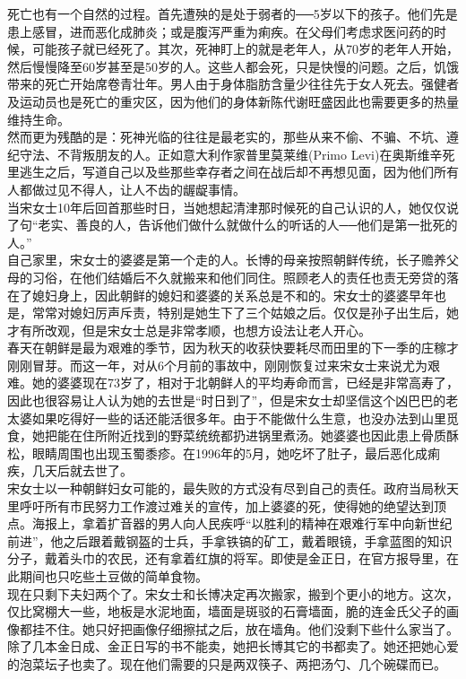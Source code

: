 死亡也有一个自然的过程。首先遭殃的是处于弱者的──5岁以下的孩子。他们先是患上感冒，进而恶化成肺炎；或是腹泻严重为痢疾。在父母们考虑求医问药的时候，可能孩子就已经死了。其次，死神盯上的就是老年人，从70岁的老年人开始，然后慢慢降至60岁甚至是50岁的人。这些人都会死，只是快慢的问题。之后，饥饿带来的死亡开始席卷青壮年。男人由于身体脂肪含量少往往先于女人死去。强健者及运动员也是死亡的重灾区，因为他们的身体新陈代谢旺盛因此也需要更多的热量维持生命。\\

然而更为残酷的是：死神光临的往往是最老实的，那些从来不偷、不骗、不坑、遵纪守法、不背叛朋友的人。正如意大利作家普里莫莱维(Primo Levi)在奥斯维辛死里逃生之后，写道自己以及些那些幸存者之间在战后却不再想见面，因为他们所有人都做过见不得人，让人不齿的龌龊事情。\\

当宋女士10年后回首那些时日，当她想起清津那时候死的自己认识的人，她仅仅说了句“老实、善良的人，告诉他们做什么就做什么的听话的人──他们是第一批死的人。”\\

自己家里，宋女士的婆婆是第一个走的人。长博的母亲按照朝鲜传统，长子赡养父母的习俗，在他们结婚后不久就搬来和他们同住。照顾老人的责任也责无旁贷的落在了媳妇身上，因此朝鲜的媳妇和婆婆的关系总是不和的。宋女士的婆婆早年也是，常常对媳妇厉声斥责，特别是她生下了三个姑娘之后。仅仅是孙子出生后，她才有所改观，但是宋女士总是非常孝顺，也想方设法让老人开心。\\

春天在朝鲜是最为艰难的季节，因为秋天的收获快要耗尽而田里的下一季的庄稼才刚刚冒芽。而这一年，对从6个月前的事故中，刚刚恢复过来宋女士来说尤为艰难。她的婆婆现在73岁了，相对于北朝鲜人的平均寿命而言，已经是非常高寿了，因此也很容易让人认为她的去世是“时日到了”，但是宋女士却坚信这个凶巴巴的老太婆如果吃得好一些的话还能活很多年。由于不能做什么生意，也没办法到山里觅食，她把能在住所附近找到的野菜统统都扔进锅里煮汤。她婆婆也因此患上骨质酥松，眼睛周围也出现玉蜀黍疹。在1996年的5月，她吃坏了肚子，最后恶化成痢疾，几天后就去世了。\\

宋女士以一种朝鲜妇女可能的，最失败的方式没有尽到自己的责任。政府当局秋天里呼吁所有市民努力工作渡过难关的宣传，加上婆婆的死，使得她的绝望达到顶点。海报上，拿着扩音器的男人向人民疾呼“以胜利的精神在艰难行军中向新世纪前进”，他之后跟着戴钢盔的士兵，手拿铁镐的矿工，戴着眼镜，手拿蓝图的知识分子，戴着头巾的农民，还有拿着红旗的将军。即使是金正日，在官方报导里，在此期间也只吃些土豆做的简单食物。\\

现在只剩下夫妇两个了。宋女士和长博决定再次搬家，搬到个更小的地方。这次，仅比窝棚大一些，地板是水泥地面，墙面是斑驳的石膏墙面，脆的连金氏父子的画像都挂不住。她只好把画像仔细擦拭之后，放在墙角。他们没剩下些什么家当了。除了几本金日成、金正日写的书不能卖，她把长博其它的书都卖了。她还把她心爱的泡菜坛子也卖了。现在他们需要的只是两双筷子、两把汤勺、几个碗碟而已。\\

